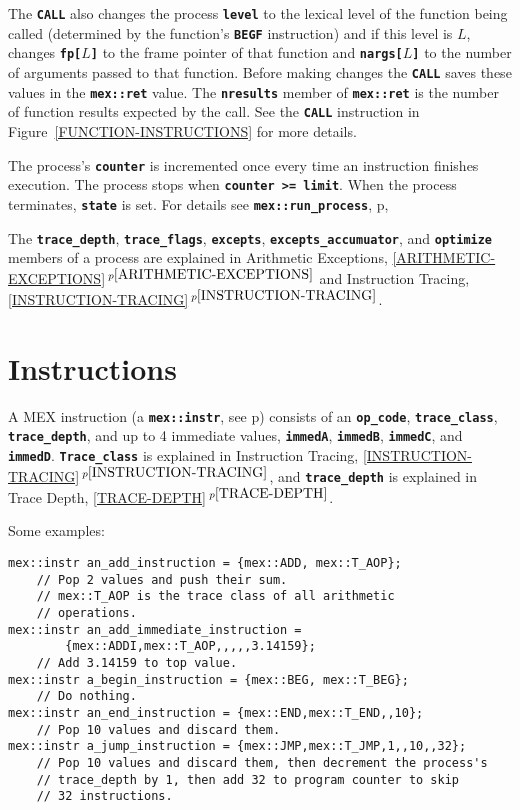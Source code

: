 \documentclass[12pt]{article}
\newcommand{\TT}[1]{{\tt \bfseries #1}}
\newcommand{\itemref}[1]{\ref{#1}$\,^{p\pageref{#1}}$}
\newcommand{\pagref}[1]{p\pageref{#1}}
\newcommand{\EOL}{\penalty \exhyphenpenalty}
\newenvironment{indpar}[1][0.3in]%
	{\begin{list}{}%
		     {\setlength{\itemsep}{0in}%
		      \setlength{\topsep}{0in}%
		      \setlength{\parsep}{1ex}%
		      \setlength{\labelwidth}{#1}%
		      \setlength{\leftmargin}{#1}%
		      \addtolength{\leftmargin}{\labelsep}}%
	 \item}%
	{\end{list}}
\begin{document}
The \TT{CALL} also changes the process \TT{level} to the lexical level
of the function being called (determined by the function's \TT{BEGF}
instruction) and if this level is $L$, changes \TT{fp[$L$]} to the
frame pointer of that function and \TT{nargs[$L$]} to the number of
arguments passed to that function.  Before making changes the \TT{CALL}
saves these values in the \TT{mex::ret} value.
The \TT{nresults} member of \TT{mex::ret}
is the number of function results expected by the call.
See the \TT{CALL} instruction in Figure~\ref{FUNCTION-INSTRUCTIONS}
for more details.

The process's \TT{counter} is incremented once every time an instruction
finishes execution.  The process stops when \TT{counter >= limit}. 
When the process terminates, \TT{state} is set.  For details
see \TT{mex::run\_process}, \pagref{MEX::RUN_PROCESS},

The \TT{trace\_depth}, \TT{trace\_flags}, \TT{excepts},
\TT{excepts\_accumuator}, and \TT{optimize}
members of a process
are explained in Arithmetic Exceptions, \itemref{ARITHMETIC-EXCEPTIONS}
and Instruction Tracing, \itemref{INSTRUCTION-TRACING}.


\section{Instructions}
\label{INSTRUCTIONS}

A MEX instruction (a \TT{mex::instr}, see \pagref{MEX::INSTR})
consists of an \TT{op\_code}, \TT{trace\_class}, \TT{trace\_\EOL depth},
and up to 4 immediate values,
\TT{immedA}, \TT{immedB}, \TT{immedC}, and \TT{immedD}.
\TT{Trace\_class} is explained in Instruction Tracing,
\itemref{INSTRUCTION-TRACING}, and
\TT{trace\_depth} is explained in Trace Depth,
\itemref{TRACE-DEPTH}.

Some examples:
\begin{indpar}\begin{verbatim}
mex::instr an_add_instruction = {mex::ADD, mex::T_AOP};
    // Pop 2 values and push their sum.
    // mex::T_AOP is the trace class of all arithmetic
    // operations.
mex::instr an_add_immediate_instruction =
        {mex::ADDI,mex::T_AOP,,,,,3.14159};
    // Add 3.14159 to top value.
mex::instr a_begin_instruction = {mex::BEG, mex::T_BEG};
    // Do nothing.
mex::instr an_end_instruction = {mex::END,mex::T_END,,10};
    // Pop 10 values and discard them.
mex::instr a_jump_instruction = {mex::JMP,mex::T_JMP,1,,10,,32};
    // Pop 10 values and discard them, then decrement the process's
    // trace_depth by 1, then add 32 to program counter to skip
    // 32 instructions.
\end{verbatim}\end{indpar}
\end{document}
